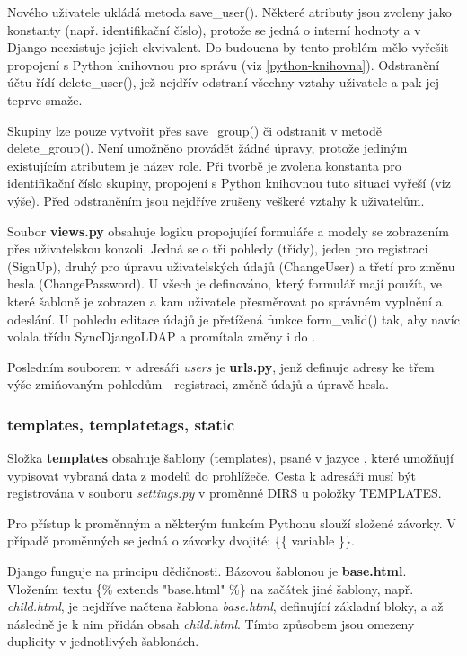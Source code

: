Nového uživatele ukládá metoda \textsf{save\_user()}. Některé atributy jsou zvoleny jako konstanty (např. identifikační číslo), protože se jedná o interní hodnoty  a v Django neexistuje jejich ekvivalent. Do budoucna by tento problém mělo vyřešit propojení s Python knihovnou pro správu (viz \ref{python-knihovna}). Odstranění účtu řídí \textsf{delete\_user()}, jež nejdřív odstraní všechny vztahy uživatele a pak jej teprve smaže. 

Skupiny lze pouze vytvořit přes \textsf{save\_group()} či odstranit v metodě \textsf{delete\_group()}. Není umožněno provádět žádné úpravy, protože jediným existujícím atributem je název role. Při tvorbě je zvolena konstanta pro identifikační číslo skupiny, propojení s Python knihovnou tuto situaci vyřeší (viz výše). Před odstraněním jsou nejdříve zrušeny veškeré vztahy k uživatelům. 
 
Soubor \textbf{views.py} obsahuje logiku propojující formuláře a modely se zobrazením přes uživatelskou konzoli. Jedná se o tři pohledy (třídy), jeden pro registraci (\textsf{SignUp}), druhý pro úpravu uživatelských údajů (\textsf{ChangeUser}) a třetí pro změnu hesla (\textsf{ChangePassword}). U všech je definováno, který formulář mají použít, ve které šabloně je zobrazen a kam uživatele přesměrovat po správném vyplnění a odeslání. U pohledu editace údajů je přetížená funkce \textsf{form\_valid()} tak, aby navíc volala třídu \textsf{SyncDjangoLDAP} a promítala změny i do .

Posledním souborem v adresáři \textit{users} je \textbf{urls.py}, jenž definuje  adresy ke třem výše zmiňovaným pohledům - registraci, změně údajů a úpravě hesla.

\subsubsection{templates, templatetags, static}
Složka \textbf{templates} obsahuje šablony (templates), psané v jazyce , které umožňují vypisovat vybraná data z modelů do prohlížeče. Cesta k adresáři musí být registrována v souboru \textit{settings.py} v proměnné \textsf{DIRS} u položky \textsf{TEMPLATES}.

Pro přístup k proměnným a některým funkcím Pythonu slouží složené závorky. V případě proměnných se jedná o závorky dvojité: \textsf{\{\{ variable \}\}}. 

Django funguje na principu dědičnosti. Bázovou šablonou je \textbf{base.html}. Vložením textu \textsf{\{\% extends "base.html" \%\}} na začátek jiné šablony, např. \textit{child.html}, je nejdříve načtena šablona \textit{base.html}, definující základní bloky, a až následně je k nim přidán obsah \textit{child.html}. Tímto způsobem jsou omezeny duplicity v jednotlivých šablonách.

